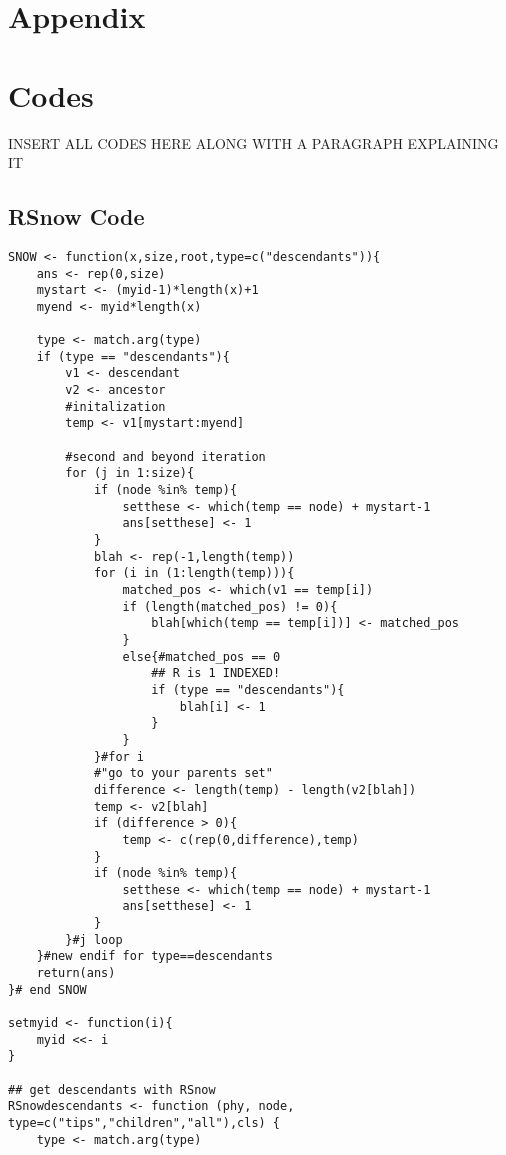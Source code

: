\documentclass[11pt,letterpaper]{article}
\begin{document}
\section{Appendix}

\appendix
\section{Codes} \label{App:AppendixA}

INSERT ALL CODES HERE ALONG WITH A PARAGRAPH EXPLAINING IT
\subsection{RSnow Code}
\begin{lstlisting}[style=MyR]
SNOW <- function(x,size,root,type=c("descendants")){
    ans <- rep(0,size)
    mystart <- (myid-1)*length(x)+1
    myend <- myid*length(x)

    type <- match.arg(type)
    if (type == "descendants"){
        v1 <- descendant
        v2 <- ancestor
        #initalization
        temp <- v1[mystart:myend]

        #second and beyond iteration
        for (j in 1:size){
            if (node %in% temp){
                setthese <- which(temp == node) + mystart-1
                ans[setthese] <- 1
            }
            blah <- rep(-1,length(temp))
            for (i in (1:length(temp))){
                matched_pos <- which(v1 == temp[i])
                if (length(matched_pos) != 0){
                    blah[which(temp == temp[i])] <- matched_pos
                }
                else{#matched_pos == 0
                    ## R is 1 INDEXED!
                    if (type == "descendants"){
                        blah[i] <- 1
                    }
                }
            }#for i 
            #"go to your parents set"
            difference <- length(temp) - length(v2[blah])
            temp <- v2[blah]
            if (difference > 0){
                temp <- c(rep(0,difference),temp)
            }
            if (node %in% temp){
                setthese <- which(temp == node) + mystart-1
                ans[setthese] <- 1
            }
        }#j loop
    }#new endif for type==descendants
    return(ans)
}# end SNOW

setmyid <- function(i){
    myid <<- i
}

## get descendants with RSnow
RSnowdescendants <- function (phy, node, type=c("tips","children","all"),cls) {
    type <- match.arg(type)


\end{lstlisting}
\end{document}
